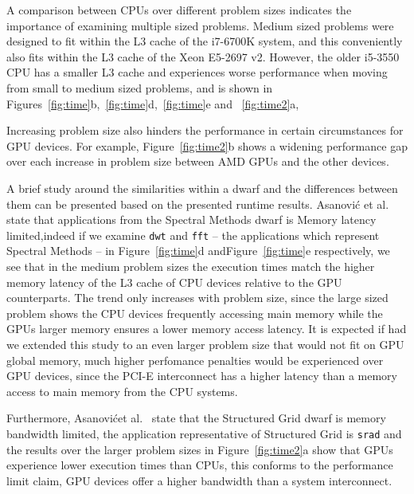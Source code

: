 \documentclass[../document.tex]{subfiles}
\begin{document}
A comparison between CPUs over different problem sizes indicates the importance of examining multiple sized problems.
Medium sized problems were designed to fit within the L3 cache of the i7-6700K system, and this conveniently also fits within the L3 cache of the Xeon E5-2697 v2.
However, the older i5-3550 CPU has a smaller L3 cache and experiences worse performance when moving from small to medium sized problems, and is shown in Figures~\ref{fig:time}b,~\ref{fig:time}d,~\ref{fig:time}e and ~\ref{fig:time2}a,

Increasing problem size also hinders the performance in certain circumstances for GPU devices.
For example, Figure~\ref{fig:time2}b shows a widening performance gap over each increase in problem size between AMD GPUs and the other devices.

A brief study around the similarities within a dwarf and the differences between them can be presented based on the presented runtime results.
Asanovi\'{c} et al.~\cite{asanovic2006landscape} state that applications from the Spectral Methods dwarf is Memory latency limited,indeed if we examine {\tt dwt} and {\tt fft} -- the applications which represent Spectral Methods -- in Figure~\ref{fig:time}d andFigure~\ref{fig:time}e respectively, we see that in the medium problem sizes the execution times match the higher memory latency of the L3 cache of CPU devices relative to the GPU counterparts.
The trend only increases with problem size, since the large sized problem shows the CPU devices frequently accessing main memory while the GPUs larger memory ensures a lower memory access latency.
It is expected if had we extended this study to an even larger problem size that would not fit on GPU global memory, much higher perfomance penalties would be experienced over GPU devices, since the PCI-E interconnect has a higher latency than a memory access to main memory from the CPU systems.

Furthermore, Asanovi\'{c}et al.~\cite{asanovic2006landscape} state that the Structured Grid dwarf is memory bandwidth limited, the application representative of Structured Grid is {\tt srad} and the results over the larger problem sizes in Figure~\ref{fig:time2}a show that GPUs experience lower execution times than CPUs, this conforms to the performance limit claim, GPU devices offer a higher bandwidth than a system interconnect.

\end{document}

